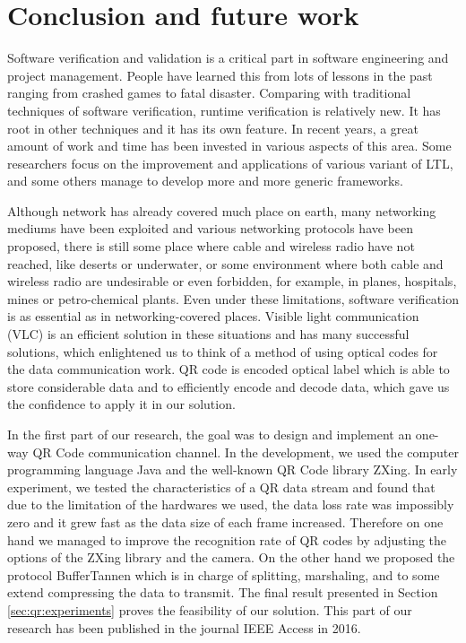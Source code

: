 
\chapter{Conclusion and future work}

Software verification and validation is a critical part in software engineering and project management. People have learned this from lots of lessons in the past ranging from crashed games to fatal disaster. Comparing with traditional techniques of software verification, runtime verification is relatively new. It has root in other techniques and it has its own feature. In recent years, a great amount of work and time has been invested in various aspects of this area. Some researchers focus on the improvement and applications of various variant of LTL, and some others manage to develop more and more generic frameworks.

Although network has already covered much place on earth, many networking mediums have been exploited and various networking protocols have been proposed, there is still some place where cable and wireless radio have not reached, like deserts or underwater, or some environment where both cable and wireless radio are undesirable or even forbidden, for example, in planes, hospitals, mines or petro-chemical plants. Even under these limitations, software verification is as essential as in networking-covered places. Visible light communication (VLC) is an efficient solution in these situations and has many successful solutions, which enlightened us to think of a method of using optical codes for the data communication work. QR code is encoded optical label which is able to store considerable data and to efficiently encode and decode data, which gave us the confidence to apply it in our solution.

In the first part of our research, the goal was to design and implement an one-way QR Code communication channel. In the development, we used the computer programming language Java and the well-known QR Code library ZXing. In early experiment, we tested the characteristics of a QR data stream and found that due to the limitation of the hardwares we used, the data loss rate was impossibly zero and it grew fast as the data size of each frame increased. Therefore on one hand we managed to improve the recognition rate of QR codes by adjusting the options of the ZXing library and the camera. On the other hand we proposed the protocol BufferTannen which is in charge of splitting, marshaling, and to some extend compressing the data to transmit. The final result presented in Section \ref{sec:qr:experiments} proves the feasibility of our solution. This part of our research has been published in the journal IEEE Access in 2016.

